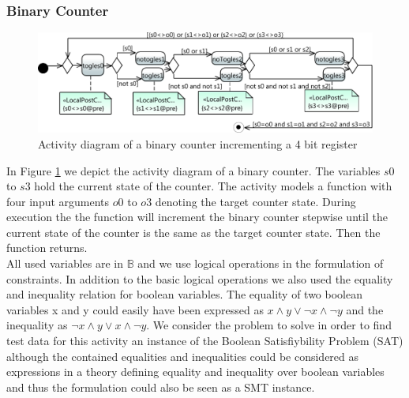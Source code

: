 \subsubsection{Binary Counter}
\begin{figure}
\includegraphics[width=\textwidth]{./pics/BinaryCounter.pdf}
\caption{Activity diagram of a binary counter incrementing a 4 bit register}
\label{fig:BinaryCounter}
\end{figure}
In Figure \ref{fig:BinaryCounter} we depict the activity diagram of a binary counter. The variables $s0$ to $s3$ hold the current state of the counter. The activity models a function with four input arguments $o0$ to $o3$ denoting the target counter state. During execution the the function will increment the binary counter stepwise until the current state of the counter is the same as the target counter state. Then the function returns.\\
All used variables are in $\mathbb{B}$ and we use logical operations in the formulation of constraints. In addition to the basic logical operations we also used the equality and inequality relation for boolean variables. The equality of two boolean variables x and y could easily have been expressed as $x \land y \lor \neg x \land \neg y$ and the inequality as $\neg x \land y \lor x \land \neg y$. We consider the problem to solve in order to find test data for this activity an instance of the Boolean Satisfiybility Problem (SAT) although the contained equalities and inequalities could be considered as expressions in a theory defining equality and inequality over boolean variables and thus the formulation could also be seen as a SMT instance.\\
